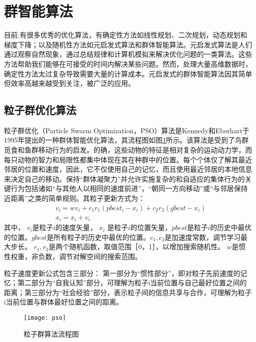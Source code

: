 \section{群智能算法}
目前,有很多优秀的优化算法，有确定性方法如线性规划、二次规划，动态规划和梯度下降；以及随机性方法如元启发式算法和群体智能算法。元启发式算法是人们通过观察自然现象，通过总结规律和计算机模拟来解决优化问题的一类算法。这些方法帮助我们能够在可接受的时间内解决某些问题。然而，处理大量高维数据时，确定性方法太过复杂导致需要大量的计算成本。元启发式的群体智能算法因其简单但效率高越来越受到关注，被广泛的应用。

  \subsection{粒子群优化算法}
  粒子群优化\cite{pso}（Particle Swarm Optimization，PSO）算法是Kennedy和Eberhart于1995年提出的一种群体智能优化算法，其流程图如图\ref{fig:pso}所示。该算法是受到了鸟群觅食和鱼群移动行为的启发。的确，这些动物的特征是相对复杂的运动动力学，而每只动物的智力和局限性都集中体现在其在种群中的位置。每个个体仅了解其最近邻居的位置和速度，因此，它不仅使用自己的记忆，而且使用最近邻居的本地信息来决定自己的移动。保持“群体凝聚力”并允许实施复杂的和自适应的集体行为的关键行为包括诸如“与其他人以相同的速度前进”，“朝同一方向移动”或“与邻居保持近距离”之类的简单规则。其粒子更新方式为：
  \begin{align}
    &v_i= wv_i +c_1r_1(pbest_i-x_i )+c_2r_2(gbest-x_i )\\
    &x_{i} = x_i+v_i 
  \end{align}
  其中， $v_i$是粒子$i$的速度矢量， $x_i$ 是粒子$i$的位置矢量，$pbest$是粒子$i$的历史中最优的位置。$gbest$是所有粒子的历史中最优的位置。$c_1,c_2$是加速度常数，调节学习最大步长。 $r_1,r_2$是两个随机函数，取值范围［0，1］，以增加搜索随机性。 $w$是惯性权重，非负数，调节对解空间的搜索范围。

  粒子速度更新公式包含三部分： 第一部分为“惯性部分”，即对粒子先前速度的记忆；第二部分为“自我认知”部分，可理解为粒子i当前位置与自己最好位置之间的距离；第三部分为“社会经验”部分，表示粒子间的信息共享与合作，可理解为粒子i当前位置与群体最好位置之间的距离。
  \begin{figure}[htbp]
    \centering
    \texttt{[image: pso]}
    \caption{粒子群算法流程图}
    \label{fig:pso}
  \end{figure}

